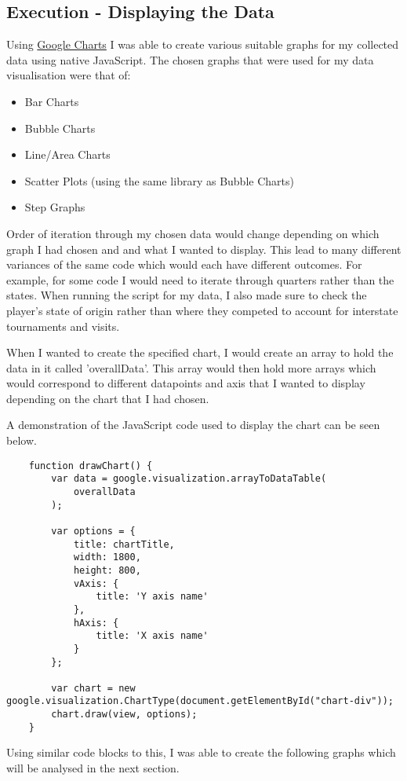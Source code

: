 \documentclass[11pt, oneside, a4paper]{article}
\begin{document}
\subsection{Execution - Displaying the Data}
Using \href{https://developers.google.com/chart}{Google Charts} I was able to create various suitable graphs for my collected data using native JavaScript. The chosen graphs that were used for my data visualisation were that of:
\begin{itemize}
	\item Bar Charts
	\item Bubble Charts
	\item Line/Area Charts
	\item Scatter Plots (using the same library as Bubble Charts)
	\item Step Graphs
\end{itemize}

Order of iteration through my chosen data would change depending on which graph I had chosen and and what I wanted to display. This lead to many different variances of the same code which would each have different outcomes. For example, for some code I would need to iterate through quarters rather than the states. When running the script for my data, I also made sure to check the player's state of origin rather than where they competed to account for interstate tournaments and visits. 

When I wanted to create the specified chart, I would create an array to hold the data in it called 'overallData'. This array would then hold more arrays which would correspond to different datapoints and axis that I wanted to display depending on the chart that I had chosen. 

A demonstration of the JavaScript code used to display the chart can be seen below.

\begin{lstlisting}    
    function drawChart() {
		var data = google.visualization.arrayToDataTable(
			overallData
		);
		
		var options = {
			title: chartTitle,
			width: 1800,
			height: 800,
			vAxis: {
				title: 'Y axis name'
			},
			hAxis: {
				title: 'X axis name'
			}
		};
									
		var chart = new google.visualization.ChartType(document.getElementById("chart-div"));
		chart.draw(view, options);
	}
\end{lstlisting}

Using similar code blocks to this, I was able to create the following graphs which will be analysed in the next section.
\end{document}
